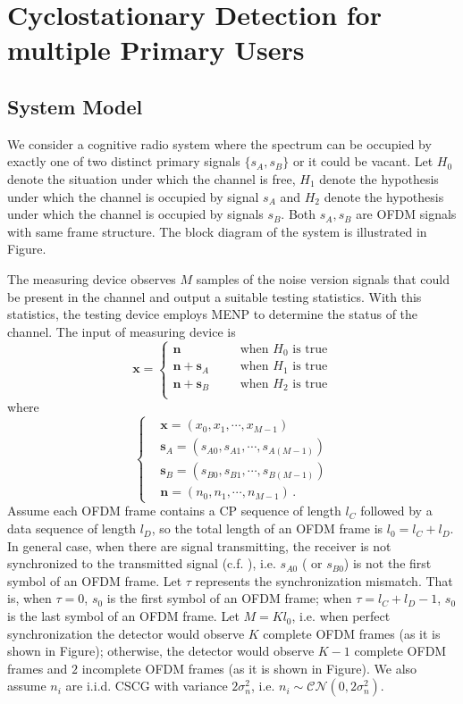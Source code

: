 \section{Cyclostationary Detection for multiple Primary Users}
\subsection{System Model}

We consider a cognitive radio system where the spectrum can be occupied by exactly one of two distinct primary signals $\{s_A, s_B\}$ or it could be vacant. Let $H_0$ denote the situation under which the channel is free, $H_1$ denote the hypothesis under which the channel is occupied by signal $s_A$ and $H_2$ denote the hypothesis under which the channel is occupied by signals $s_B$. Both $s_A, s_B$ are OFDM signals with same frame structure. The block diagram of the system is illustrated in Figure.

The measuring device observes $M$ samples of the noise version signals that could be present in the channel and output a suitable testing statistics. With this statistics, the testing device employs MENP to determine the status of the channel. The input of measuring device is
\begin{equation}
  \mathbf{x} = \begin{cases}
	\mathbf{n}\;\;\;\;\;\;&\text{when $H_0$ is true}\\
	\mathbf{n}+\mathbf{s}_A\;\;\;\;\;\;&\text{when $H_1$ is true}\\
	\mathbf{n}+\mathbf{s}_B\;\;\;\;\;\;&\text{when $H_2$ is true}\\
  \end{cases}
  \label{equ:1209a1}
\end{equation}
where 
\begin{equation}
  \begin{cases}
	&\mathbf{x} = (x_0, x_1, \cdots, x_{M-1})\\
	&\mathbf{s}_A = (s_{A0}, s_{A1}, \cdots, s_{A(M-1)})\\
	&\mathbf{s}_B = (s_{B0}, s_{B1}, \cdots, s_{B(M-1)})\\
	&\mathbf{n} = (n_{0}, n_{1}, \cdots, n_{M-1})\,.
  \end{cases}
  \label{xssn}
\end{equation}
Assume each OFDM frame contains a CP sequence of length $l_C$ followed by a data sequence of length $l_D$, so the total length of an OFDM frame is $l_0 = l_C+l_D$. In general case, when there are signal transmitting, the receiver is not synchronized to the transmitted signal (c.f. ), i.e. $s_{A0}$ ( or $s_{B0}$) is not the first symbol of an OFDM frame. Let $\tau$ represents the synchronization mismatch. That is, when $\tau = 0$, $s_0$ is the first symbol of an OFDM frame; when $\tau = l_C+l_D -1$, $s_0$ is the last symbol of an OFDM frame. Let $M = Kl_0$, i.e. when perfect synchronization the detector would observe $K$ complete  OFDM frames (as it is shown in Figure); otherwise, the detector would observe $K-1$ complete OFDM frames and $2$ incomplete OFDM frames (as it is shown in Figure). We also assume  $n_i$ are i.i.d. CSCG with variance $2\sigma_n^2$, i.e. $n_i \sim \mathcal{CN}(0, 2\sigma_n^2)$. 

